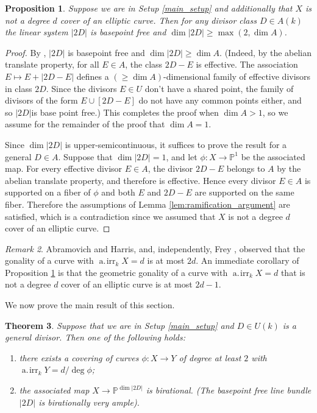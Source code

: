 \documentclass[11pt]{amsart}
\newcommand{\PP}{\mathbb{P}}
\newcommand{\airr}{\operatorname{a.\!irr}}
\newtheorem{theorem}{Theorem}[section]
\newtheorem{proposition}[theorem]{Proposition}
\theoremstyle{definition}
\theoremstyle{remark}
\newtheorem{remark}[theorem]{Remark}
\begin{document}
\begin{proposition}\label{prop:elliptic-exceptions} 
Suppose we are in Setup \ref{main_setup} and additionally that \(X\) is not a degree \(d\) cover of an elliptic curve.  Then for any divisor class $D \in A(k)$ the linear system \(|2D|\) is basepoint free and $\dim |2D| \geqslant \max(2, \dim A)$. 
\end{proposition}
\begin{proof}
By \cite[Lemma 1]{Abramovich-Harris1991}, \(|2D|\) is basepoint free and \(\dim |2D| \geqslant\dim A\).  (Indeed, by the abelian translate property, for all \(E \in A\), the class \(2D - E\) is effective.  The association \(E \mapsto E + |2D - E|\) defines a \((\geqslant \dim A)\)-dimensional family of effective divisors in class \(2D\). Since the divisors $E \in U$ don't have a shared point, the family of divisors of the form $E \cup [2D-E]$ do not have any common points either, and so $|2D|$is base point free.)  This completes the proof when \(\dim A > 1\), so we assume for the remainder of the proof that \(\dim A = 1\). 

Since $\dim |2D|$ is upper-semicontinuous, it suffices to prove the result for a general $D \in A$.  
Suppose that $\dim |2D|=1$, and let $\phi: X \to \PP^1$ be the associated map. For every effective divisor $E \in A$, the divisor $2D-E$ belongs to $A$ by the abelian translate property, and therefore is effective. Hence every divisor $E \in A$ is supported on a fiber of $\phi$ and both \(E\) and \(2D-E\) are supported on the same fiber.  Therefore the assumptions of Lemma \ref{lem:ramification_argument} are satisfied, which is a contradiction since we assumed that \(X\) is not a degree \(d\) cover of an elliptic curve.
\end{proof}
\begin{remark}\label{rem:gonality-1}
Abramovich and Harris, and, independently, Frey \cite{frey1994}, observed that the gonality of a curve with $\airr_k X = d$ is at most $2d$. An immediate corollary of Proposition \ref{prop:elliptic-exceptions} is that the geometric gonality of a curve with $\airr_k X = d$ that is not a degree $d$ cover of an elliptic curve is at most $2d-1$.
\end{remark} 
We now prove the main result of this section.
\begin{theorem}\label{2D-is-birational}
Suppose that we are in Setup \ref{main_setup} and \(D \in U(k)\) is a general divisor. Then one of the following holds:
\begin{enumerate}
    \item\label{non-birational} there exists a covering of curves $\phi \colon X \to Y$ of degree at least \(2\) with $\airr_k Y = d/ \deg \phi$;
        \item\label{birational} the associated map $X \to \PP^{\dim |2D|}$ is birational. (The basepoint free line bundle \(|2D|\) is birationally very ample).

\end{enumerate}
\end{theorem}
\end{document}
